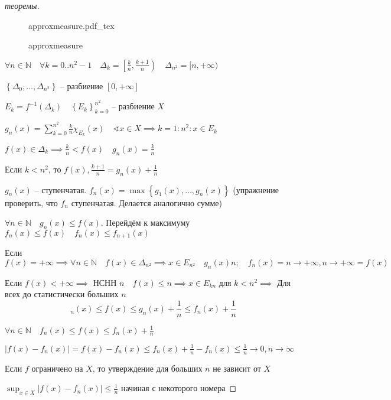 \documentclass{book}
\newcommand\N{\ensuremath{\mathbb{N}}}
\theoremstyle{definition}
\newcommand{\incfig}[1]{%
    \def\svgwidth{\columnwidth}
    {#1.pdf_tex}
}
\begin{document}
\begin{proof}
    [теоремы]
\begin{figure}[!ht]
    \centering
    \incfig{approxmeasure}
    \caption{approxmeasure}
    \label{fig:approxmeasure}
\end{figure}
$\forall n\in \N \quad \forall k = 0  .. n^2-1\quad \Delta_k = \left[ \frac{k}{n}, \frac{k+1}{n} \right) \quad \Delta_{n^2} = [n, +\infty )$

$\left\{ \Delta_0, \ldots, \Delta_{n^2} \right\} $ -- разбиение $[0, +\infty ]$

$E_k = f^{-1}\left( \Delta_k \right) \quad \left\{ E_k \right\} _{k=0}^{n^2}$ -- разбиение $X$

$g_n(x) = \sum_{k=0}^{n^2} \frac{k}{n}\chi_{E_k}(x)\quad \sphericalangle x\in X \implies k = 1 : n^2: x\in E_k$ 

$f(x) \in \Delta_k \implies \frac{k}{n} <f(x)\quad g_n(x) = \frac{k}{n}$ 

Если $k < n^2$, то $f(x) , \frac{k+1}{n} = g_n(x) + \frac{1}{n}$ 

$g_n(x)$ -- ступенчатая. $f_n(x) = \max\left\{ g_1(x), \ldots, g_n\left( x \right)  \right\} $ (упражнение проверить, что $f_n$ ступенчатая. Делается аналогично сумме)

$\forall n\in \N \quad g_n(x) \leqslant f(x)$. Перейдём к максимуму $f_n(x)\leqslant f(x)\quad f_n(x)\leqslant f_{n+1}(x)$

Если $f(x) = +\infty \implies \forall n\in \N \quad f(x) \in \Delta_{n^2} \implies x\in E_{n^2}\quad g_n(x) n;\quad f_n(x) = n \to +\infty , n\to +\infty  = f(x) $

Если $f(x) < + \infty \implies $ НСНН $n\quad f\left( x \right) \leqslant n \implies x\in E_{kn}$ для $k < n^2\implies $ Для всех до статистически больших $n$ \[_n(x) \leqslant f(x) \leqslant g_n(x) + \frac{1}{n} \leqslant f_n(x) + \frac{1}{n}\] 

$\forall n\in \N \quad f_n(x) \leqslant f(x) \leqslant f_n(x) + \frac{1}{n}$ 

$\left| f(x) - f_n(x) \right|  = f(x) - f_n(x) \leqslant f_n(x) + \frac{1}{n} -f_n(x) \leqslant \frac{1}{n} \to 0, n\to \infty $ 

Если $f$ ограничено на  $X$, то утверждение для больших $n$ не зависит от  $X$

$\sup_{x\in X}\left| f(x) - f_n(x) \right| \leqslant \frac{1}{n}$ начиная с некоторого номера
\end{proof}
\end{document}
